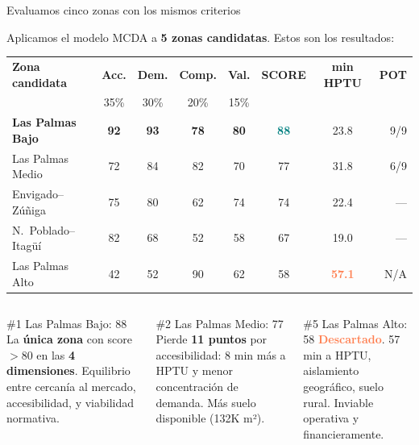 \documentclass[aspectratio=169, 11pt]{beamer}
\newcommand{\highlight}[1]{\textcolor{teal}{\textbf{#1}}}
\newcommand{\danger}[1]{\textcolor{coral}{\textbf{#1}}}
\begin{document}
\begin{frame}{Evaluamos cinco zonas con los mismos criterios}

{\small Aplicamos el modelo MCDA a \textbf{5 zonas candidatas}. Estos son los resultados:}

\vspace{8pt}
\begin{center}
{\small
\begin{tabular}{@{}lccccccr@{}}
\toprule
\textbf{Zona candidata} & \textbf{Acc.} & \textbf{Dem.} & \textbf{Comp.} & \textbf{Val.} & \textbf{SCORE} & \textbf{min HPTU} & \textbf{POT} \\
 & {\tiny 35\%} & {\tiny 30\%} & {\tiny 20\%} & {\tiny 15\%} & & & \\
\midrule
\rowcolor{teal!12}
\textbf{Las Palmas Bajo} & \textbf{92} & \textbf{93} & \textbf{78} & \textbf{80} & \highlight{88} & 23.8 & 9/9 \\
Las Palmas Medio & 72 & 84 & 82 & 70 & 77 & 31.8 & 6/9 \\
Envigado--Zúñiga & 75 & 80 & 62 & 74 & 74 & 22.4 & --- \\
N.\ Poblado--Itagüí & 82 & 68 & 52 & 58 & 67 & 19.0 & --- \\
\rowcolor{coral!6}
Las Palmas Alto & 42 & 52 & 90 & 62 & 58 & \danger{57.1} & N/A \\
\bottomrule
\end{tabular}
}
\end{center}

\vspace{8pt}
\begin{columns}[T]
\begin{exampleblock}{\small \#1 Las Palmas Bajo: 88}
\footnotesize La \textbf{única zona} con score $>$80 en las \textbf{4 dimensiones}. Equilibrio entre cercanía al mercado, accesibilidad, y viabilidad normativa.
\end{exampleblock}

\begin{block}{\small \#2 Las Palmas Medio: 77}
\footnotesize Pierde \textbf{11 puntos} por accesibilidad: 8 min más a HPTU y menor concentración de demanda. Más suelo disponible (132K m²).
\end{block}

\begin{alertblock}{\small \#5 Las Palmas Alto: 58}
\footnotesize \danger{Descartado}. 57 min a HPTU, aislamiento geográfico, suelo rural. Inviable operativa y financieramente.
\end{alertblock}
\end{columns}
\end{frame}
\end{document}
